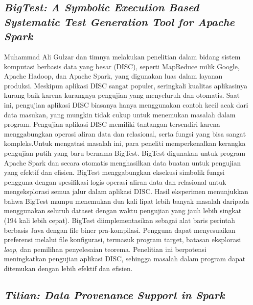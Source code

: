 \subsection{\emph{BigTest: A Symbolic Execution Based Systematic Test Generation Tool for Apache Spark}}
\label{subsec:BigTest: A Symbolic Execution Based Systematic Test Generation Tool for Apache Spark}

Muhammad Ali Gulzar dan timnya melakukan penelitian dalam bidang sistem komputasi berbasis data yang besar (DISC), seperti MapReduce milik Google, Apache Hadoop, dan Apache Spark, yang digunakan luas dalam layanan produksi. Meskipun aplikasi DISC sangat populer, seringkali kualitas aplikasinya kurang baik karena kurangnya pengujian yang menyeluruh dan otomatis. Saat ini, pengujian aplikasi DISC biasanya hanya menggunakan contoh kecil acak dari data masukan, yang mungkin tidak cukup untuk menemukan masalah dalam program. Pengujian aplikasi DISC memiliki tantangan tersendiri karena menggabungkan operasi aliran data dan relasional, serta fungsi yang bisa sangat kompleks.Untuk mengatasi masalah ini, para peneliti memperkenalkan kerangka pengujian putih yang baru bernama BigTest. BigTest digunakan untuk program Apache Spark dan secara otomatis menghasilkan data buatan untuk pengujian yang efektif dan efisien. BigTest menggabungkan eksekusi simbolik fungsi pengguna dengan spesifikasi logis operasi aliran data dan relasional untuk mengeksplorasi semua jalur dalam aplikasi DISC. Hasil eksperimen menunjukkan bahwa BigTest mampu menemukan dua kali lipat lebih banyak masalah daripada menggunakan seluruh dataset dengan waktu pengujian yang jauh lebih singkat (194 kali lebih cepat). BigTest diimplementasikan sebagai alat baris perintah berbasis Java dengan file biner pra-kompilasi. Pengguna dapat menyesuaikan preferensi melalui file konfigurasi, termasuk program target, batasan eksplorasi \emph{loop}, dan pemilihan penyelesaian teorema. Penelitian ini berpotensi meningkatkan pengujian aplikasi DISC, sehingga masalah dalam program dapat ditemukan dengan lebih efektif dan efisien.

\subsection{\emph{Titian: Data Provenance Support in Spark}}
\label{subsec:Titian: Data Provenance Support in Spark}

